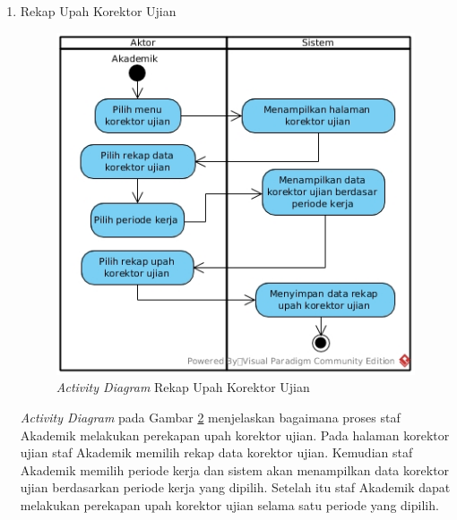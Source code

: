 \begin{enumerate}
\begin{enumerate}[label=\alph*.]
\begin{figure}[H]
            		    \caption{\emph{Activity Diagram} Rekap Upah Pengawas Ujian}
            		    \label{activity_rekap_pengawas}
            		\end{figure}
            		\emph{Activity Diagram} pada Gambar \ref{activity_rekap_pengawas} menjelaskan bagaimana proses staf Akademik melakukan perekapan upah pengawas ujian. Pertama, pada halaman pengawas ujian staf Akademik memilih rekap data pengawas ujian. Kemudian staf Akademik memilih periode kerja dan sistem akan menampilkan data pengawas ujian berdasarkan periode kerja yang dipilih. Setelah itu staf Akademik dapat melakukan perekapan upah pengawas ujian selama satu periode yang dipilih.\newpage
            		\item Rekap Upah Korektor Ujian
            		\begin{figure}[H]
            		    \centering            		    \includegraphics[width=11cm]{gambar/activity/rekap-upah-korektor}
            		    \caption{\emph{Activity Diagram} Rekap Upah Korektor Ujian}
            		    \label{activity_rekap_korektor}
            		\end{figure}
            		\emph{Activity Diagram} pada Gambar \ref{activity_rekap_korektor} menjelaskan bagaimana proses staf Akademik melakukan perekapan upah korektor ujian. Pada halaman korektor ujian staf Akademik memilih rekap data korektor ujian. Kemudian staf Akademik memilih periode kerja dan sistem akan menampilkan data korektor ujian berdasarkan periode kerja yang dipilih. Setelah itu staf Akademik dapat melakukan perekapan upah korektor ujian selama satu periode yang dipilih.\newpage

\end{enumerate}
\end{enumerate}

